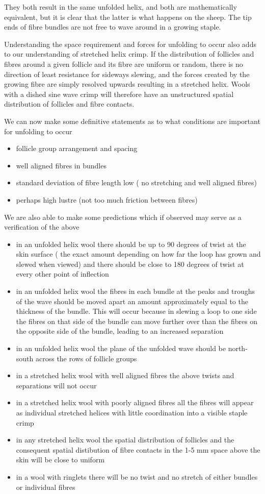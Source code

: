 \documentclass[titlepage,10pt]{article}  %
\begin{document}
They both result in the same unfolded helix, and both are mathematically equivalent, but it is clear that the latter is what happens on the sheep. The tip ends of fibre bundles are not free to wave around in a growing staple.

Understanding the space requirement and forces for unfolding to occur also adds to our understanding of stretched helix crimp. If the distribution of follicles and fibres around a  given follicle and its fibre are uniform or random, there is no direction of least resistance for sideways slewing, and the forces created by the growing fibre are simply resolved upwards resulting in a stretched helix. Wools with a dished sine wave crimp will therefore have an unstructured spatial distribution of follicles and fibre contacts.

We can now make some definitive statements as to what conditions are important for unfolding to occur
\begin{itemize}
\item follicle group arrangement and spacing
\item well aligned fibres in bundles
\item standard deviation of fibre length low ( no stretching and well aligned fibres)
\item perhaps high lustre (not too much friction between fibres)
\end{itemize}

We are also able to make some predictions which if observed may serve as a verification of the above
\begin{itemize}
\item   in an unfolded helix wool there should be up to 90 degrees of twist at the skin surface ( the exact amount depending on how far the loop has grown and slewed when viewed) and there should be close to 180 degrees of twist at every other point of inflection
\item in an unfolded helix wool the fibres in each bundle at the peaks and troughs of the wave should be moved apart an amount approximately equal to the thickness of the bundle. This will occur because  in slewing a loop to one side the fibres on that side of the bundle can move further over than the fibres on the opposite side of the bundle, leading to an increased separation
\item in an unfolded helix wool the plane of the unfolded wave should be north-south across the rows of follicle groups
\item in a stretched helix wool with well aligned fibres the above twists and separations will not occur 
\item in a stretched helix wool with poorly aligned fibres all  the fibres will appear as  individual stretched helices with little coordination into a visible staple crimp
\item in any stretched helix wool the spatial distribution of follicles and the consequent spatial distibution of fibre contacts in the 1-5 mm space above the skin will be close to uniform
\item in a wool with ringlets there will be no twist and no stretch of either bundles or individual fibres
\end{itemize}
\end{document}
